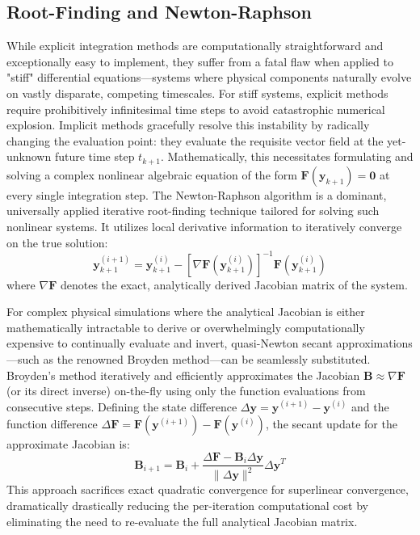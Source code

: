 \subsection{Root-Finding and Newton-Raphson}
While explicit integration methods are computationally straightforward and exceptionally easy to implement, they suffer from a fatal flaw when applied to "stiff" differential equations—systems where physical components naturally evolve on vastly disparate, competing timescales. For stiff systems, explicit methods require prohibitively infinitesimal time steps to avoid catastrophic numerical explosion. Implicit methods gracefully resolve this instability by radically changing the evaluation point: they evaluate the requisite vector field at the yet-unknown future time step $t_{k+1}$.
Mathematically, this necessitates formulating and solving a complex nonlinear algebraic equation of the form $\bm{F}(\bm{y}_{k+1}) = \bm{0}$ at every single integration step.
The Newton-Raphson algorithm is a dominant, universally applied iterative root-finding technique tailored for solving such nonlinear systems. It utilizes local derivative information to iteratively converge on the true solution:
\begin{equation}
    \bm{y}^{(i+1)}_{k+1} = \bm{y}^{(i)}_{k+1} - \left[ \nabla \bm{F}\left(\bm{y}^{(i)}_{k+1}\right) \right]^{-1} \bm{F}\left(\bm{y}^{(i)}_{k+1}\right)
\end{equation}
where $\nabla \bm{F}$ denotes the exact, analytically derived Jacobian matrix of the system. 

For complex physical simulations where the analytical Jacobian is either mathematically intractable to derive or overwhelmingly computationally expensive to continually evaluate and invert, quasi-Newton secant approximations—such as the renowned Broyden method—can be seamlessly substituted. Broyden's method iteratively and efficiently approximates the Jacobian $\bm{B} \approx \nabla \bm{F}$ (or its direct inverse) on-the-fly using only the function evaluations from consecutive steps. Defining the state difference $\Delta \bm{y} = \bm{y}^{(i+1)} - \bm{y}^{(i)}$ and the function difference $\Delta \bm{F} = \bm{F}(\bm{y}^{(i+1)}) - \bm{F}(\bm{y}^{(i)})$, the secant update for the approximate Jacobian is:
\begin{equation}
    \bm{B}_{i+1} = \bm{B}_i + \frac{\Delta \bm{F} - \bm{B}_i \Delta \bm{y}}{\|\Delta \bm{y}\|^2} \Delta \bm{y}^T
\end{equation}
This approach sacrifices exact quadratic convergence for superlinear convergence, dramatically drastically reducing the per-iteration computational cost by eliminating the need to re-evaluate the full analytical Jacobian matrix.


